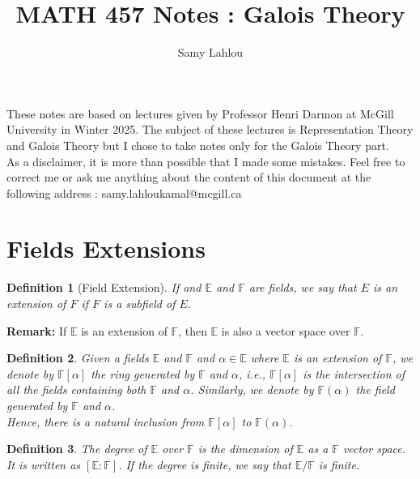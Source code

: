 \documentclass{article}
\title{MATH 457 Notes : Galois Theory}
\author{Samy Lahlou}
\date{}
\newtheorem*{definition}{Definition}
\newcommand{\F}{\mathbb{F}}
\newcommand{\E}{\mathbb{E}}
\newenvironment{remark}{\noindent\textbf{Remark:}}{}
\begin{document}
\maketitle

These notes are based on lectures given by Professor Henri Darmon at McGill University in Winter 2025. The subject of these lectures is Representation Theory and Galois Theory but I chose to take notes only for the Galois Theory part. \\
As a disclaimer, it is more than possible that I made some mistakes. Feel free to correct me or ask me anything about the content of this document at the following address : samy.lahloukamal@mcgill.ca

\tableofcontents

\newpage

\section{Fields Extensions}

\begin{definition}[Field Extension]
    If and $\E$ and $\F$ are fields, we say that $E$ is an extension of $F$ if $F$ is a subfield of $E$.
\end{definition}

\begin{remark}
    If $\E$ is an extension of $\F$, then $\E$ is also a vector space over $\F$.
\end{remark}

\begin{definition}
    Given a fields $\E$ and $\F$ and $\alpha \in \E$ where $\E$ is an extension of $\F$, we denote by $\F[\alpha]$ the ring generated by $\F$ and $\alpha$, i.e., $\F[\alpha]$ is the intersection of all the fields containing both $\F$ and $\alpha$. Similarly, we denote by $\F(\alpha)$ the field generated by $\F$ and $\alpha$.\\
    Hence, there is a natural inclusion from $\F[\alpha]$ to $\F(\alpha)$.
\end{definition}

\begin{definition}
    The degree of $\E$ over $\F$ is the dimension of $\E$ as a $\F$ vector space. It is written as $[\E:\F]$. If the degree is finite, we say that $\E/\F$ is finite.
\end{definition}
\end{document}
